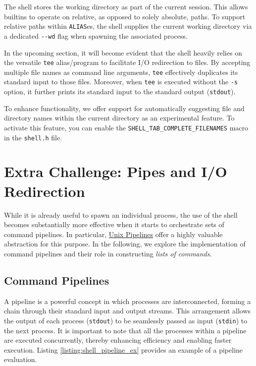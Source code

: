 The shell stores the working directory as part of the current session. This allows builtins to operate on relative, as opposed to solely absolute, paths. To support relative paths within \texttt{ALIAS}es, the shell supplies the current working directory via a dedicated \texttt{-\phantom{}-wd} flag when spawning the associated process.

In the upcoming section, it will become evident that the shell heavily relies on the versatile \texttt{tee} alias/program to facilitate I/O redirection to files. By accepting multiple file names as command line arguments, \texttt{tee} effectively duplicates its standard input to those files.  Moreover, when \texttt{tee} is executed without the \texttt{-s} option, it further prints its standard input to the standard output (\texttt{stdout}).

To enhance functionality, we offer support for automatically suggesting file and directory names within the current directory as an experimental feature. To activate this feature, you can enable the \texttt{SHELL\_TAB\_COMPLETE\_FILENAMES} macro in the \texttt{shell.h} file.

\section{Extra Challenge: Pipes and I/O Redirection} \label{sec:shell_pipes_and_io}

While it is already useful to spawn an individual process, the use of the shell becomes substantially more effective when it starts to orchestrate sets of command pipelines. In particular, \href{https://en.wikipedia.org/wiki/Pipeline_(Unix)}{Unix Pipelines} offer a highly valuable abstraction for this purpose. In the following, we explore the implementation of command pipelines and their role in constructing \emph{lists of commands}.
\subsection{Command Pipelines}

A pipeline is a powerful concept in which processes are interconnected, forming a chain through their standard input and output streams. This arrangement allows the output of each process (\texttt{stdout}) to be seamlessly passed as input (\texttt{stdin}) to the next process. It is important to note that all the processes within a pipeline are executed concurrently, thereby enhancing efficiency and enabling faster execution. Listing \ref{listing:shell_pipeline_ex} provides an example of a pipeline evaluation.

